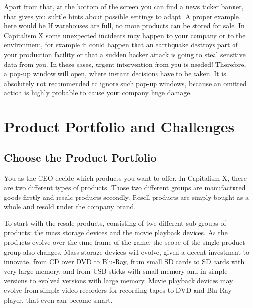 \documentclass[11pt,titlepage,oneside,openany]{book}
\begin{document}
Apart from that, at the bottom of the screen you can find a news ticker banner, that gives you subtle hints about possible settings to adapt. A proper example here would be  If warehouses are full, no more products can be stored for sale. In Capitalism X some unexpected incidents may happen to your company or to the environment, for example it could happen that an earthquake destroys part of your production facility or that a sudden hacker attack is going to steal sensitive data from you. In these cases, urgent intervention from you is needed! Therefore, a pop-up window will open, where instant decisions have to be taken. It is absolutely not recommended to ignore such pop-up windows, because an omitted action is highly probable to cause your company huge damage.


 







\section{Product Portfolio and Challenges}

\subsection{Choose the Product Portfolio}
\label{sub:portfolio}

You as the CEO decide which products you want to offer. In Capitalism X, there are two different types of products. Those two different groups are manufactured goods firstly and resale products secondly. Resell products are simply bought as a whole and resold under the company brand.

To start with the resale products, consisting of two different sub-groups of products: the mass storage devices and the movie playback devices. As the products evolve over the time frame of the game, the scope of the single product group also changes. Mass storage devices will evolve, given a decent investment to innovate, from CD over DVD to Blu-Ray, from small SD cards to SD cards with very large memory, and from USB sticks with small memory and in simple versions to evolved versions with large memory. Movie playback devices may evolve from simple video recorders for recording tapes to DVD and Blu-Ray player, that even can become smart.
\end{document}
